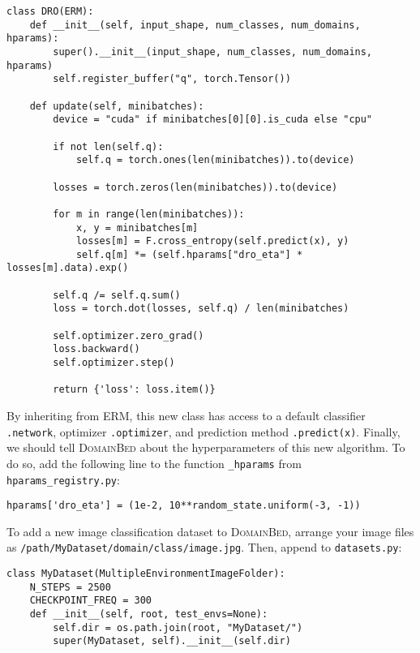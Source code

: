 \documentclass{article}
\newcommand{\domainbed}{\textsc{DomainBed}\xspace}
\begin{document}
\newsavebox{\lsta}
\begin{lrbox}{\lsta}
\begin{lstlisting}
class DRO(ERM):
    def __init__(self, input_shape, num_classes, num_domains, hparams):
        super().__init__(input_shape, num_classes, num_domains, hparams)
        self.register_buffer("q", torch.Tensor())

    def update(self, minibatches):
        device = "cuda" if minibatches[0][0].is_cuda else "cpu"

        if not len(self.q):
            self.q = torch.ones(len(minibatches)).to(device)

        losses = torch.zeros(len(minibatches)).to(device)

        for m in range(len(minibatches)):
            x, y = minibatches[m]
            losses[m] = F.cross_entropy(self.predict(x), y)
            self.q[m] *= (self.hparams["dro_eta"] * losses[m].data).exp()

        self.q /= self.q.sum()
        loss = torch.dot(losses, self.q) / len(minibatches)

        self.optimizer.zero_grad()
        loss.backward()
        self.optimizer.step()

        return {'loss': loss.item()}
\end{lstlisting}
\end{lrbox}

\scalebox{0.75}{\usebox{\lsta}}

By inheriting from ERM, this new class has access to a default classifier \texttt{.network}, optimizer \texttt{.optimizer}, and prediction method \texttt{.predict(x)}.
Finally, we should tell \domainbed about the hyperparameters of this new algorithm. To do so, add the following line to the function \texttt{\_hparams} from \texttt{hparams\_registry.py}:


\newsavebox{\lstc}
\begin{lrbox}{\lstc}
\begin{lstlisting}
hparams['dro_eta'] = (1e-2, 10**random_state.uniform(-3, -1))
\end{lstlisting}
\end{lrbox}

\scalebox{0.75}{\usebox{\lstc}}


To add a new image classification dataset to \domainbed, arrange your image files as \texttt{/path/MyDataset/domain/class/image.jpg}.
Then, append to \texttt{datasets.py}:

\newsavebox{\lstb}
\begin{lrbox}{\lstb}
\begin{lstlisting}
class MyDataset(MultipleEnvironmentImageFolder):
    N_STEPS = 2500
    CHECKPOINT_FREQ = 300
    def __init__(self, root, test_envs=None):
        self.dir = os.path.join(root, "MyDataset/")
        super(MyDataset, self).__init__(self.dir)
\end{lstlisting}
\end{lrbox}
\end{document}
